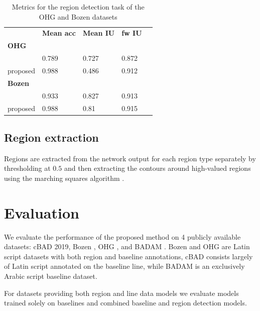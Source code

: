 \begin{table}[h!]
\begin{center}
\caption{Metrics for the region detection task of the OHG and Bozen datasets}
\label{tab:regs}
\begin{tabularx}{\columnwidth}{lp{1.7cm}p{1.7cm}p{1.7cm}p{1.7cm}} \toprule
	& \textbf{Mean acc} & \textbf{Mean IU} & \textbf{fw IU}\\
\addlinespace
\textbf{OHG}\ \\ \midrule
\cite{quiros2018multi} & 0.789 & 0.727 & 0.872\\
proposed & 0.988 & 0.486 & 0.912\\
\addlinespace
\textbf{Bozen}\ \\ \midrule
\cite{quiros2018multi} & 0.933 & 0.827 & 0.913\\
proposed & 0.988 & 0.81 & 0.915\\
\bottomrule
\end{tabularx}
\end{center}
\end{table}

\subsection{Region extraction}

Regions are extracted from the network output for each region type separately
by thresholding at $0.5$ and then extracting the contours around high-valued
regions using the marching squares algorithm \cite{lorensen1987marching}.

\section{Evaluation}

We evaluate the performance of the proposed method on 4 publicly available
datasets: cBAD 2019\cite{diem_markus_2019_3568023}, Bozen
\cite{toselli_a_h_2018_1164045}, OHG \cite{quiros2018hmms}, and BADAM
\cite{kiessling2019badam}. Bozen and OHG are Latin script datasets
with both region and baseline annotations, cBAD consists largely of Latin
script annotated on the baseline line, while BADAM is an exclusively Arabic
script baseline dataset.

For datasets providing both region and line data models we evaluate models
trained solely on baselines and combined baseline and region detection models.

